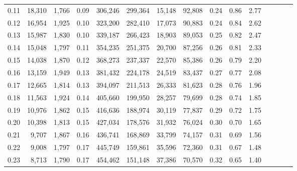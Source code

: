 \begin{tabular}{rrrcrrrrrrrrrrr}
0.11 &  18,310 &  1,766 &                                       0.09 &  306,246 &  299,364 &   15,148 &   92,808 &  0.24 &  0.86 &                         2.77 \\
0.12 &  16,954 &  1,925 &                                       0.10 &  323,200 &  282,410 &   17,073 &   90,883 &  0.24 &  0.84 &                         2.62 \\
0.13 &  15,987 &  1,830 &                                       0.10 &  339,187 &  266,423 &   18,903 &   89,053 &  0.25 &  0.82 &                         2.47 \\
0.14 &  15,048 &  1,797 &                                       0.11 &  354,235 &  251,375 &   20,700 &   87,256 &  0.26 &  0.81 &                         2.33 \\
0.15 &  14,038 &  1,870 &                                       0.12 &  368,273 &  237,337 &   22,570 &   85,386 &  0.26 &  0.79 &                         2.20 \\
0.16 &  13,159 &  1,949 &                                       0.13 &  381,432 &  224,178 &   24,519 &   83,437 &  0.27 &  0.77 &                         2.08 \\
0.17 &  12,665 &  1,814 &                                       0.13 &  394,097 &  211,513 &   26,333 &   81,623 &  0.28 &  0.76 &                         1.96 \\
0.18 &  11,563 &  1,924 &                                       0.14 &  405,660 &  199,950 &   28,257 &   79,699 &  0.28 &  0.74 &                         1.85 \\
0.19 &  10,976 &  1,862 &                                       0.15 &  416,636 &  188,974 &   30,119 &   77,837 &  0.29 &  0.72 &                         1.75 \\
0.20 &  10,398 &  1,813 &                                       0.15 &  427,034 &  178,576 &   31,932 &   76,024 &  0.30 &  0.70 &                         1.65 \\
0.21 &   9,707 &  1,867 &                                       0.16 &  436,741 &  168,869 &   33,799 &   74,157 &  0.31 &  0.69 &                         1.56 \\
0.22 &   9,008 &  1,797 &                                       0.17 &  445,749 &  159,861 &   35,596 &   72,360 &  0.31 &  0.67 &                         1.48 \\
0.23 &   8,713 &  1,790 &                                       0.17 &  454,462 &  151,148 &   37,386 &   70,570 &  0.32 &  0.65 &                         1.40 \\

\end{tabular}
